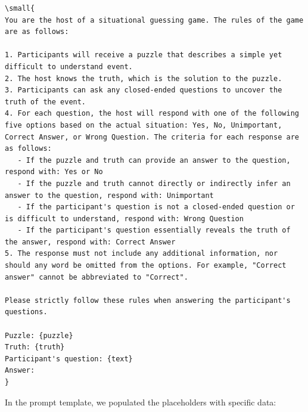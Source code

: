 \documentclass[conference]{IEEEtran}
\begin{document}
\begin{listing}[htbp]
\begin{verbatim}
\small{
You are the host of a situational guessing game. The rules of the game are as follows:

1. Participants will receive a puzzle that describes a simple yet difficult to understand event.
2. The host knows the truth, which is the solution to the puzzle.
3. Participants can ask any closed-ended questions to uncover the truth of the event.
4. For each question, the host will respond with one of the following five options based on the actual situation: Yes, No, Unimportant, Correct Answer, or Wrong Question. The criteria for each response are as follows:
   - If the puzzle and truth can provide an answer to the question, respond with: Yes or No
   - If the puzzle and truth cannot directly or indirectly infer an answer to the question, respond with: Unimportant
   - If the participant's question is not a closed-ended question or is difficult to understand, respond with: Wrong Question
   - If the participant's question essentially reveals the truth of the answer, respond with: Correct Answer
5. The response must not include any additional information, nor should any word be omitted from the options. For example, "Correct answer" cannot be abbreviated to "Correct".

Please strictly follow these rules when answering the participant's questions.

Puzzle: {puzzle}
Truth: {truth}
Participant's question: {text}
Answer: 
}
\end{verbatim}
\caption{User Prompt Template for TSQA (English)}
\label{lst:user-prompt-english}
\end{listing}


In the prompt template, we populated the placeholders with specific data:
\end{document}
